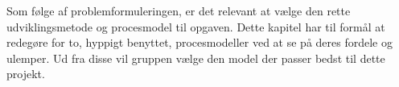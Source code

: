 Som følge af problemformuleringen, er det relevant at vælge den rette udviklingsmetode og procesmodel til opgaven.
Dette kapitel har til formål at redegøre for to, hyppigt benyttet, procesmodeller ved at se på deres fordele og ulemper.
Ud fra disse vil gruppen vælge den model der passer bedst til dette projekt.